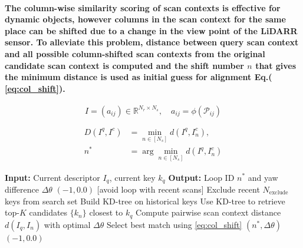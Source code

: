 \paragraph{\textnormal{The column-wise similarity scoring of scan contexts is effective for dynamic objects, however columns in the scan context for the same place can be shifted due to a change in the view point of the LiDARR sensor. To alleviate this problem, distance between query scan context and all possible column-shifted scan contexts from the original candidate scan context is computed and the shift number $n$ that gives the minimum distance is used as initial guess for alignment Eq.( \ref{eq:col_shift}).  }}


\begin{equation}
	I = (a_{ij}) \in \mathbb{R}^{N_r \times N_s}, \quad a_{ij} = \phi(\mathcal{P}_{ij})
	\label{eq:scan_context}
\end{equation}



\begin{equation}
	\begin{aligned}
		D(I^q, I^c) &= \min_{n \in [N_s]} d(I^q, I^c_n), \\
		n^* &= \arg\min_{n \in [N_s]} d(I^q, I^c_n)
	\end{aligned}
\label{eq:col_shift}
\end{equation}

\begin{algorithm}[H]
	\caption{Loop Detection with Scan Context}
	\begin{algorithmic}[1]
		\State \textbf{Input:} Current descriptor $I_q $, current key $k_q$
		\State \textbf{Output:} Loop ID $n^*$ and yaw difference $\Delta \theta$
		\State \Return $(-1, 0.0)$ [avoid loop with recent scans]
		\EndIf
		\State Exclude recent $N_{\text{exclude}}$ keys from search set
		\State Build KD-tree on historical keys
		\EndIf
		\State Use KD-tree to retrieve top-$K$ candidates $\{k_n\}$ closest to $k_q$
		\State Compute pairwise scan context distance $d(I_q, I_n)$ with optimal $\Delta \theta$
		\EndFor
		\State Select best match using \ref{eq:col_shift}
		\State \Return $(n^*, \Delta \theta)$
		\Else
		\State \Return $(-1, 0.0)$
		\EndIf
	\end{algorithmic}
\label{alg:sc}
\end{algorithm}


